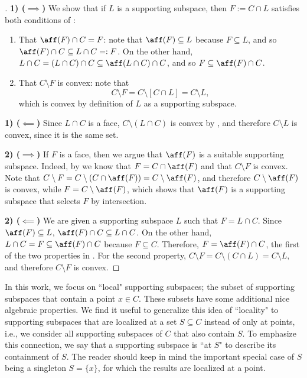 \documentclass{article}
\theoremstyle{plain}
\theoremstyle{definition}
\theoremstyle{remark}
\begin{document}
\begin{proof}[\hypertarget{loc:relation_of_supporting_subspaces_to_faces.proof}Proof of \Cref{loc:relation_of_supporting_subspaces_to_faces.statement}]
\noindent\textbf{1) ($\implies$)}
We show that if $L$ is a supporting subspace, then $F := C \cap L$ satisfies both conditions of :
\begin{enumerate}
\item That $\aff(F) \cap C = F$: note that $\aff(F) \subseteq L$ because $F \subseteq L$, and so
$\aff(F) \cap C \subseteq L \cap C =: F$.
On the other hand, $L \cap C =  (L \cap C) \cap C \subseteq \aff(L \cap C) \cap C$, and so 
$F \subseteq \aff(F) \cap C$.
\item That $C \setminus F$ is convex: note that 
\begin{equation*}
C \setminus F = C \setminus [C  \cap L] = C \setminus L,
\end{equation*}
which is convex by definition of $L$ as a supporting subspace.
\end{enumerate}

\noindent\textbf{1) ($\impliedby$)}
Since $L \cap C$ is a face, $C \setminus (L \cap C)$ is convex by
, and therefore
$C\setminus L$ is convex, since it is the same set.

\noindent\textbf{2) ($\implies$)}
If $F$ is a face, then we argue that $\aff(F)$ is a suitable 
supporting subspace. Indeed, by  we know that $F = C  \cap \aff(F)$ and that $C \setminus F$ is convex. Note that $C \setminus F = C \setminus (C \cap \aff(F))= C \setminus \aff(F)$, and therefore $C \setminus \aff(F)$ is convex, while $F = C\setminus \aff(F)$, 
which shows that $\aff(F)$ is a supporting subspace that selects
$F$ by intersection.

\noindent\textbf{2) ($\impliedby$)}
We are given a supporting subspace $L$ such that $F = L \cap C$. Since $\aff(F) \subseteq L$,
$\aff(F) \cap C \subseteq L \cap C$.
On the other hand, $L \cap C = F \subseteq \aff(F) \cap C$ because $F \subseteq C$.
Therefore, $F = \aff(F) \cap C$, the first of the two properties in .
For the second property, $C \setminus F = C \setminus (C \cap L) = C \setminus L,$
and therefore $C \setminus F$ is convex.
\end{proof}
In this work, we focus on ``local" supporting subspaces; the
subset of supporting subspaces that contain a point $x \in C$.
These subsets have some additional nice algebraic
properties. We find it useful to generalize this idea of ``locality" to
supporting subspaces that are localized at a set $S \subseteq C$ instead
of only at points, i.e., we consider all supporting subspaces of $C$ that also contain $S$.
To emphasize this connection, we say that a supporting subspace is ``at $S$" to describe its containment
of $S$. The reader should keep in
mind the important special case of $S$ being a singleton $S = \{x\}$,
for which the results are localized at a point.
\end{document}
